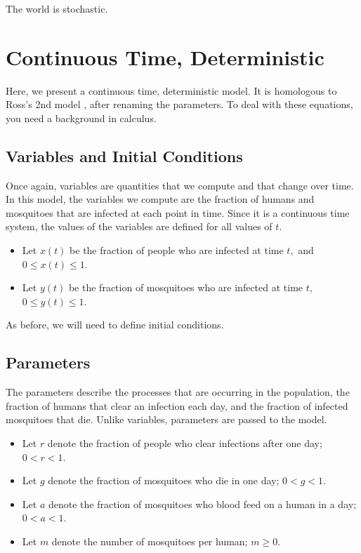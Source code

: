 \documentclass[
]{book}
\begin{document}
The world is stochastic.

\section{Continuous Time, Deterministic}\label{continuous-time-deterministic}

Here, we present a continuous time, deterministic model. It is homologous to Ross's 2nd model \autocite{RossR1911Nature}, after renaming the parameters. To deal with these equations, you need a background in calculus.

\subsection{Variables and Initial Conditions}\label{variables-and-initial-conditions}

Once again, variables are quantities that we compute and that change over time. In this model, the variables we compute are the fraction of humans and mosquitoes that are infected at each point in time. Since it is a continuous time system, the values of the variables are defined for all values of \(t.\)

\begin{itemize}
\item
  Let \(x(t)\) be the fraction of people who are infected at time \(t,\) and \(0 \leq x(t) \leq 1.\)
\item
  Let \(y(t)\) be the fraction of mosquitoes who are infected at time \(t,\) \(0 \leq y(t) \leq 1.\)
\end{itemize}

As before, we will need to define initial conditions.

\subsection{Parameters}\label{parameters-1}

The parameters describe the processes that are occurring in the population, the fraction of humans that clear an infection each day, and the fraction of infected mosquitoes that die. Unlike variables, parameters are passed to the model.

\begin{itemize}
\item
  Let \(r\) denote the fraction of people who clear infections after one day; \(0 < r < 1.\)
\item
  Let \(g\) denote the fraction of mosquitoes who die in one day; \(0 < g < 1.\)
\item
  Let \(a\) denote the fraction of mosquitoes who blood feed on a human in a day; \(0 < a < 1.\)
\item
  Let \(m\) denote the number of mosquitoes per human; \(m \geq 0.\)
\end{itemize}
\end{document}
